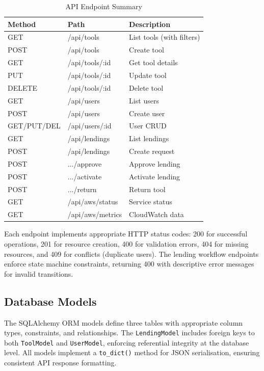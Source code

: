 \documentclass[conference]{IEEEtran}
\begin{document}
\begin{table}[H]
\centering
\caption{API Endpoint Summary}
\label{tab:endpoints}
\begin{tabular}{llp{3.5cm}}
\toprule
\textbf{Method} & \textbf{Path} & \textbf{Description} \\
\midrule
GET & /api/tools & List tools (with filters) \\
POST & /api/tools & Create tool \\
GET & /api/tools/:id & Get tool details \\
PUT & /api/tools/:id & Update tool \\
DELETE & /api/tools/:id & Delete tool \\
GET & /api/users & List users \\
POST & /api/users & Create user \\
GET/PUT/DEL & /api/users/:id & User CRUD \\
GET & /api/lendings & List lendings \\
POST & /api/lendings & Create request \\
POST & .../approve & Approve lending \\
POST & .../activate & Activate lending \\
POST & .../return & Return tool \\
GET & /api/aws/status & Service status \\
GET & /api/aws/metrics & CloudWatch data \\
\bottomrule
\end{tabular}
\end{table}

Each endpoint implements appropriate HTTP status codes: 200 for successful operations, 201 for resource creation, 400 for validation errors, 404 for missing resources, and 409 for conflicts (duplicate users). The lending workflow endpoints enforce state machine constraints, returning 400 with descriptive error messages for invalid transitions.

\subsection{Database Models}
The SQLAlchemy ORM models define three tables with appropriate column types, constraints, and relationships. The \texttt{LendingModel} includes foreign keys to both \texttt{ToolModel} and \texttt{UserModel}, enforcing referential integrity at the database level. All models implement a \texttt{to\_dict()} method for JSON serialisation, ensuring consistent API response formatting.
\end{document}
